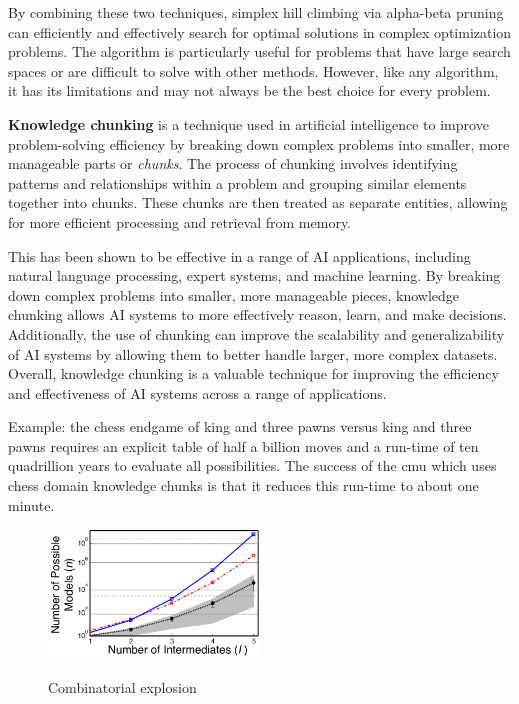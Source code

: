 By combining these two techniques, simplex hill climbing via alpha-beta pruning can efficiently and effectively search for optimal 
solutions in complex optimization problems. The algorithm is particularly useful for problems that have large search spaces or are 
difficult to solve with other methods. However, like any algorithm, it has its limitations and may not always be the best choice 
for every problem. \cite{pruning}

\textbf{Knowledge chunking} is a technique used in artificial intelligence to improve problem-solving efficiency by breaking down complex problems 
into smaller, more manageable parts or \emph{chunks}. The process of chunking involves identifying patterns and relationships within a problem 
and grouping similar elements together into chunks. These chunks are then treated as separate entities, allowing for more efficient processing and retrieval from memory.

This has been shown to be effective in a range of AI applications, including natural language processing, expert systems, 
and machine learning. By breaking down complex problems into smaller, more manageable pieces, knowledge chunking allows AI systems to 
more effectively reason, learn, and make decisions. Additionally, the use of chunking can improve the scalability and generalizability 
of AI systems by allowing them to better handle larger, more complex datasets. Overall, knowledge chunking is a valuable technique for 
improving the efficiency and effectiveness of AI systems across a range of applications. \cite{knowledgechunking}

Example: the chess endgame of king and three pawns versus king 
and three pawns requires an explicit table of half a billion 
moves and a run-time of ten quadrillion years to evaluate all
possibilities. The success of the \gls{cmu} which
uses chess domain knowledge chunks is that it reduces this
run-time to about one minute.
\\
\begin{figure}[htb]
    \centering
    \includegraphics[width=0.5\textwidth]{pics/combiexplo.png}
    \caption{Combinatorial explosion} 
    \cite{combiexplo}
    \label{fig:combiexplo}
\end{figure}
\\
